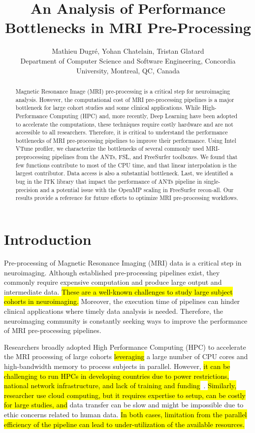 \documentclass[conference]{IEEEtran}
\title{An Analysis of Performance Bottlenecks in MRI Pre-Processing}
\author{Mathieu Dugr\'e, Yohan Chatelain, Tristan Glatard\\Department of Computer Science and Software Engineering, Concordia University, Montreal, QC, Canada}
\newcommand{\HL}[1]{\hl{#1}}
\begin{document}
\maketitle

\begin{abstract}
	Magnetic Resonance Image (MRI) pre-processing is a critical step for neuroimaging analysis. However, the computational cost of MRI pre-processing pipelines is a major bottleneck for large cohort studies and some clinical applications. While High-Performance Computing (HPC) and, more recently, Deep Learning have been adopted to accelerate the computations, these techniques require costly hardware and are not accessible to all researchers. Therefore, it is critical to understand the performance bottlenecks of MRI pre-processing pipelines to improve their performance. Using Intel VTune profiler, we characterize the bottlenecks of several commonly used MRI-preprocessing pipelines from the ANTs, FSL, and FreeSurfer toolboxes. We found that few functions contribute to most of the CPU time, and that linear interpolation is the largest contributor. Data access is also  a substantial bottleneck. Last, we identified a bug in the ITK library that impact the performance of ANTs pipeline in single-precision and a potential issue with the OpenMP scaling in FreeSurfer recon-all. Our results provide a reference for future efforts to optimize MRI pre-processing workflows.
\end{abstract}

\section{Introduction}
Pre-processing of Magnetic Resonance Imaging (MRI) data is a critical step in neuroimaging. Although established pre-processing pipelines exist, they commonly require expensive computation and produce large output and intermediate data. \HL{These are a well-known challenges to study large subject cohorts in neuroimaging.} Moreover, the execution time of pipelines can hinder clinical applications where timely data analysis is needed. Therefore, the neuroimaging community is constantly seeking ways to improve the performance of MRI pre-processing pipelines.

Researchers broadly adopted High Performance Computing (HPC) to accelerate the MRI processing of large cohorts \HL{leveraging} a large number of CPU cores and high-bandwidth memory to process subjects in parallel. However, \HL{it can be challenging to run HPCs in developing countries due to power restrictions, national network infrastructure, and lack of training and funding}~\cite{NRG-SC23}. \HL{Similarly, researcher use cloud computing, but it requires expertise to setup, can be costly for large studies, and} data transfer can be slow and might be impossible due to ethic concerns related to human data. \HL{In both cases, limitation from the parallel efficiency of the pipeline can lead to under-utilization of the available resources.}
\end{document}
